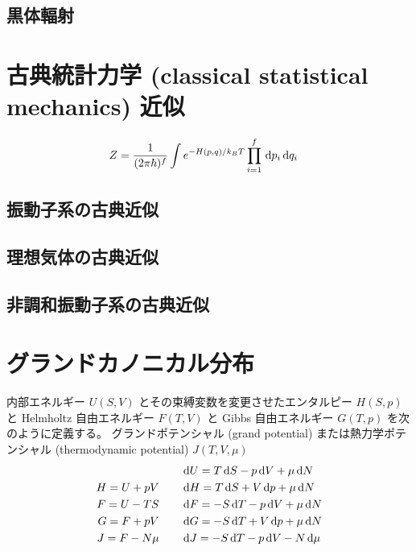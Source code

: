 \documentclass[uplatex,diffipdfmx,a4paper,11pt]{jlreq}
\numberwithin{equation}{section}
\theoremstyle{definition}
\begin{document}
\subsection{黒体輻射}

\section{古典統計力学 (classical statistical mechanics) 近似}

\begin{theorem}
  \begin{align}
    Z & = \frac{1}{(2\pi\hbar)^f}\int e^{-H(p, q)/k_BT}\prod_{i=1}^{f}\dl{p_i}\dl{q_i}
  \end{align}
\end{theorem}

\subsection{振動子系の古典近似}
\subsection{理想気体の古典近似}
\subsection{非調和振動子系の古典近似}


\section{グランドカノニカル分布}
\begin{definition}
  内部エネルギー $U(S, V)$ とその束縛変数を変更させたエンタルピー $H(S, p)$ と Helmholtz 自由エネルギー $F(T, V)$ と Gibbs 自由エネルギー $G(T, p)$ を次のように定義する。
  グランドポテンシャル (grand potential) または熱力学ポテンシャル (thermodynamic potential) $J(T, V, \mu)$
  \begin{align}
                 & \qquad \dl{U} = T\dl{S} - p\dl{V} + \mu\dl{N}  \\
    H = U + pV   & \qquad \dl{H} = T\dl{S} + V\dl{p} + \mu\dl{N}  \\
    F = U - TS   & \qquad \dl{F} = -S\dl{T} - p\dl{V} + \mu\dl{N} \\
    G = F + pV   & \qquad \dl{G} = -S\dl{T} + V\dl{p} + \mu\dl{N} \\
    J = F - N\mu & \qquad \dl{J} = -S\dl{T} - p\dl{V} - N\dl{\mu}
  \end{align}
\end{definition}
\end{document}
